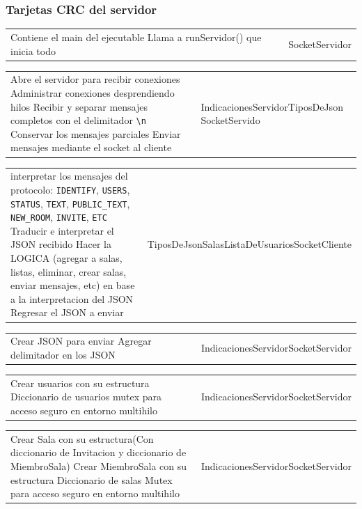 \documentclass{article}
\newcommand{\tarjeta}[3]{%
      \begin{center}
      \begin{tabular}{|>{\raggedright\arraybackslash}p{7.8cm}|>{\raggedright\arraybackslash}p{4.2cm}|}
        \hline
        \multicolumn{2}{|c|}{#1} \\ \hline
        #2 & #3 \\ \hline
      \end{tabular}
      \end{center}
    }
\begin{document}
\subsubsection{Tarjetas CRC del servidor}

\tarjeta{Servidor}
{Contiene el main del ejecutable\newline
 Llama a runServidor() que inicia todo}
{SocketServidor}

\tarjeta{SocketServidor}
{Abre el servidor para recibir conexiones\newline
 Administrar conexiones desprendiendo hilos\newline
 Recibir y separar mensajes completos con el delimitador \texttt{\textbackslash n}\newline
 Conservar los mensajes parciales\newline
 Enviar mensajes mediante el socket al cliente}
{IndicacionesServidor\newline TiposDeJson \newline SocketServido}

\tarjeta{IndicacionesServidor}
{interpretar los mensajes del protocolo: \texttt{IDENTIFY}, \texttt{USERS}, \texttt{STATUS}, \texttt{TEXT}, \texttt{PUBLIC\_TEXT}, \texttt{NEW\_ROOM}, \texttt{INVITE}, \texttt{ETC}\newline
 Traducir e interpretar el JSON recibido\newline
 Hacer la LOGICA (agregar a salas, listas, eliminar, crear salas, enviar mensajes, etc) en base a la interpretacion del JSON \newline
 Regresar el JSON a enviar}
{TiposDeJson\newline Salas\newline ListaDeUsuarios\newline SocketCliente}

\tarjeta{TiposDeJson}
{Crear JSON para enviar\newline
 Agregar delimitador en los JSON}
{IndicacionesServidor\newline SocketServidor}

\tarjeta{ListaDeUsuarios}
{Crear usuarios con su estructura\newline
 Diccionario de usuarios\newline
 mutex para acceso seguro en entorno multihilo}
{IndicacionesServidor\newline SocketServidor}

\tarjeta{Salas}
{Crear Sala con su estructura(Con diccionario de Invitacion y diccionario de MiembroSala)\newline
Crear MiembroSala con su estructura\newline
 Diccionario de salas\newline
 Mutex para acceso seguro en entorno multihilo}
{IndicacionesServidor\newline SocketServidor}
\end{document}
